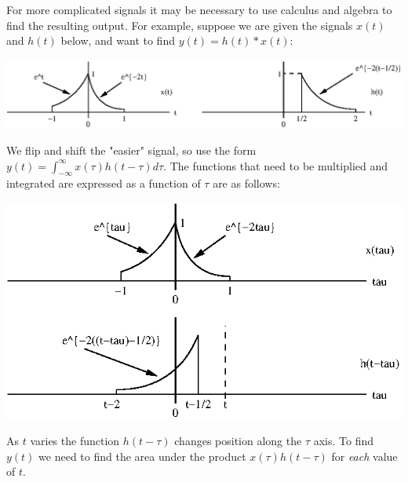 \documentclass[10pt]{beamer}
\newcommand{\conv}{\ast}
\begin{document}
For more complicated signals it may be necessary to use calculus and algebra to find the resulting output.  For example, suppose we are given the signals $x(t)$ and $h(t)$ below, and want to find $y(t) = h(t) \conv x(t)$:
\begin{center}
  \includegraphics{convexample6}
\end{center}
We flip and shift the "easier" signal, so use the form $y(t) = \int_{-\infty}^\infty x(\tau) h(t-\tau) d\tau$.  The functions that need to be multiplied and integrated are expressed as a function of $\tau$ are as follows:
\begin{center}
  \includegraphics{convexample7}
\end{center}
As $t$ varies the function $h(t-\tau)$ changes position along the $\tau$ axis.  To find $y(t)$ we need to find the area under the product $x(\tau) h(t-\tau)$ for {\em each} value of $t$.
\end{document}
